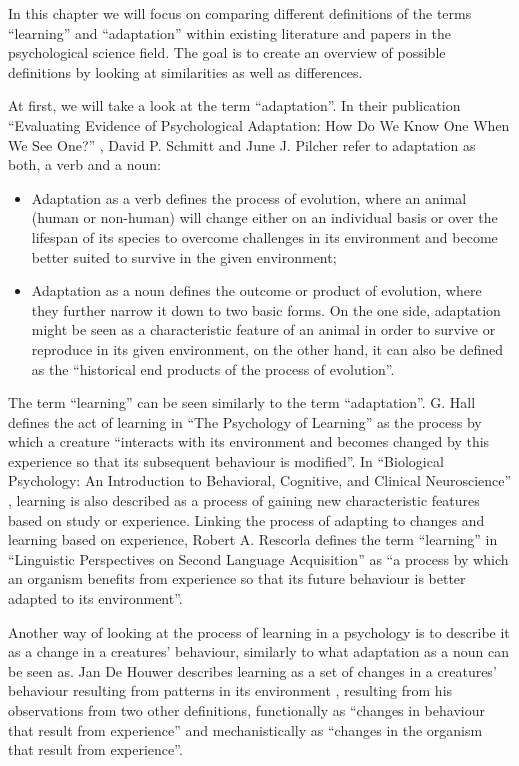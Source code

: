 \documentclass[conference]{IEEEtran}
\begin{document}
	In this chapter we will focus on comparing different definitions of the terms “learning” and “adaptation” within existing literature and papers in the psychological science field. The goal is to create an overview of possible definitions by looking at similarities as well as differences.

	At first, we will take a look at the term “adaptation”. In their publication “Evaluating Evidence of Psychological Adaptation: How Do We Know One When We See One?” \cite{b1}, David P. Schmitt and June J. Pilcher refer to adaptation as both, a verb and a noun:
	\begin{itemize}
		\item Adaptation as a verb defines the process of evolution, where an animal (human or non-human) will change either on an individual basis or over the lifespan of its species to overcome challenges in its environment and become better suited to survive in the given environment;
		\item Adaptation as a noun defines the outcome or product of evolution, where they further narrow it down to two basic forms. On the one side, adaptation might be seen as a characteristic feature of an animal in order to survive or reproduce in its given environment, on the other hand, it can also be defined as the “historical end products of the process of evolution”.
	\end{itemize}

	The term “learning” can be seen similarly to the term “adaptation”. G. Hall defines the act of learning in ``The Psychology of Learning'' \cite{b2} as the process by which a creature “interacts with its environment and becomes changed by this experience so that its subsequent behaviour is modified”. In ``Biological Psychology: An Introduction to Behavioral, Cognitive, and Clinical Neuroscience'' \cite{b3}, learning is also described as a process of gaining new characteristic features based on study or experience. Linking the process of adapting to changes and learning based on experience, Robert A. Rescorla defines the term “learning” in ``Linguistic Perspectives on Second Language Acquisition'' \cite{b4} as “a process by which an organism benefits from experience so that its future behaviour is better adapted to its environment”.

	Another way of looking at the process of learning in a psychology is to describe it as a change in a creatures' behaviour, similarly to what adaptation as a noun can be seen as. Jan De Houwer describes learning as a set of changes in a creatures' behaviour resulting from patterns in its environment \cite{b5}, resulting from his observations from two other definitions, functionally as “changes in behaviour that result from experience” and mechanistically as “changes in the organism that result from experience”.
\end{document}
